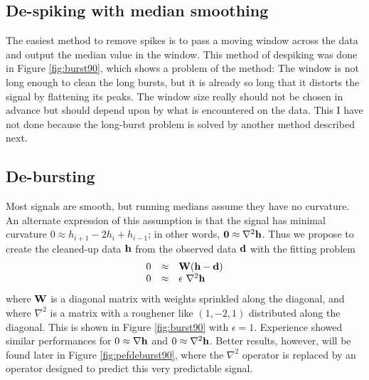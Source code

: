 \subsection{De-spiking with median smoothing}

The easiest method to remove spikes is to pass a moving window
across the data and output the median value in the window.
This method of despiking was done in Figure \ref{fig:burst90},
which shows a problem of the method:
The window is not long enough to clean the long bursts,
but it is already so long
that it distorts the signal by flattening its peaks.
The window size really should not be chosen in advance
but should depend upon by what is encountered on the data.
This I have not done
because the long-burst problem is solved
by another method described next.

\subsection{De-bursting}
Most signals are smooth, but running medians assume they have no curvature.
An alternate expression of this assumption is that the signal
has minimal curvature
$ 0 \approx h_{i+1} -2 h_{i} + h_{i-1} $;
in other words,
$ \bold 0 \approx \nabla^2 \bold h$.
Thus we propose to create the cleaned-up data $\bold h$
from the observed data $\bold d$ with the fitting problem
\begin{equation}
  \begin{array}{lll}
        0 &\approx & \bold W  (\bold h - \bold d)                       \\
        0 &\approx & \epsilon\  \nabla^2   \bold h
  \end{array}
\end{equation}
where $\bold W$ is a diagonal matrix with weights sprinkled along the diagonal,
and where $\nabla^2$ is a matrix
with a roughener like $(1,-2,1)$ distributed along the diagonal.
This is shown in Figure \ref{fig:burst90} with $\epsilon = 1$.
Experience showed similar performances
for $0 \approx \nabla \bold h$ and $0 \approx \nabla^2 \bold h$.
Better results, however, will be found later in Figure
\ref{fig:pefdeburst90},
where the $\nabla^2$ operator is replaced
by an operator designed to predict this very predictable signal.


